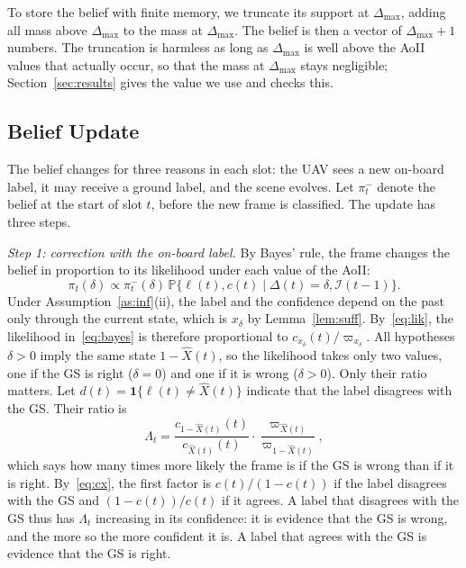 \documentclass[5p,twocolumn]{elsarticle}
\theoremstyle{remark}
\newcommand{\Prob}{\mathbb{P}}
\newcommand{\ind}[1]{\mathbf{1}\{#1\}}
\newcommand{\I}{\mathcal{I}}
\newcommand{\lab}{\ell}
\begin{document}
To store the belief with finite memory, we truncate its support at $\Delta_{\max}$, adding all mass above $\Delta_{\max}$ to the mass at $\Delta_{\max}$. The belief is then a vector of $\Delta_{\max}+1$ numbers. The truncation is harmless as long as $\Delta_{\max}$ is well above the AoII values that actually occur, so that the mass at $\Delta_{\max}$ stays negligible; Section~\ref{sec:results} gives the value we use and checks this.

\subsection{Belief Update}\label{sec:update}
The belief changes for three reasons in each slot: the UAV sees a new on-board label, it may receive a ground label, and the scene evolves. Let $\pi^-_t$ denote the belief at the start of slot $t$, before the new frame is classified. The update has three steps.

\emph{Step 1: correction with the on-board label.} By Bayes' rule, the frame changes the belief in proportion to its likelihood under each value of the AoII:
\begin{equation}\label{eq:bayes}
\pi_t(\delta)\propto\pi^-_t(\delta)\,\Prob\big\{\lab(t),c(t)\mid\Delta(t)=\delta,\I(t-1)\big\}.
\end{equation}
Under Assumption~\ref{as:inf}(ii), the label and the confidence depend on the past only through the current state, which is $x_\delta$ by Lemma~\ref{lem:suff}. By~\eqref{eq:lik}, the likelihood in~\eqref{eq:bayes} is therefore proportional to $c_{x_\delta}(t)/\varpi_{x_\delta}$. All hypotheses $\delta>0$ imply the same state $1-\hat X(t)$, so the likelihood takes only two values, one if the GS is right ($\delta=0$) and one if it is wrong ($\delta>0$). Only their ratio matters. Let $d(t)=\ind{\lab(t)\neq\hat X(t)}$ indicate that the label disagrees with the GS. Their ratio is
\begin{equation}\label{eq:Lambda}
\Lambda_t=\frac{c_{1-\hat X(t)}(t)}{c_{\hat X(t)}(t)}\cdot\frac{\varpi_{\hat X(t)}}{\varpi_{1-\hat X(t)}},
\end{equation}
which says how many times more likely the frame is if the GS is wrong than if it is right. By~\eqref{eq:cx}, the first factor is $c(t)/(1-c(t))$ if the label disagrees with the GS and $(1-c(t))/c(t)$ if it agrees. A label that disagrees with the GS thus has $\Lambda_t$ increasing in its confidence: it is evidence that the GS is wrong, and the more so the more confident it is. A label that agrees with the GS is evidence that the GS is right.
\end{document}
